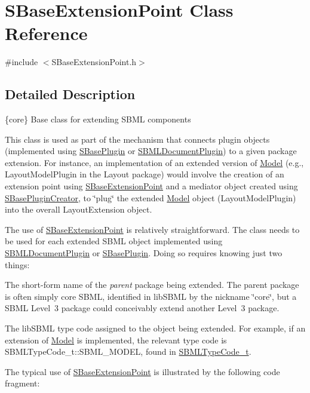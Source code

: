 \hypertarget{class_s_base_extension_point}{}\section{S\+Base\+Extension\+Point Class Reference}
\label{class_s_base_extension_point}


{\ttfamily \#include $<$S\+Base\+Extension\+Point.\+h$>$}



\subsection{Detailed Description}
\{core\} Base class for extending S\+B\+ML components



\begin{DoxyParagraph}{}
This class is used as part of the mechanism that connects plugin objects (implemented using \hyperlink{class_s_base_plugin}{S\+Base\+Plugin} or \hyperlink{class_s_b_m_l_document_plugin}{S\+B\+M\+L\+Document\+Plugin}) to a given package extension. For instance, an implementation of an extended version of \hyperlink{class_model}{Model} (e.\+g., Layout\+Model\+Plugin in the Layout package) would involve the creation of an extension point using \hyperlink{class_s_base_extension_point}{S\+Base\+Extension\+Point} and a mediator object created using \hyperlink{class_s_base_plugin_creator}{S\+Base\+Plugin\+Creator}, to \char`\"{}plug\char`\"{} the extended \hyperlink{class_model}{Model} object (Layout\+Model\+Plugin) into the overall Layout\+Extension object.
\end{DoxyParagraph}
The use of \hyperlink{class_s_base_extension_point}{S\+Base\+Extension\+Point} is relatively straightforward. The class needs to be used for each extended S\+B\+ML object implemented using \hyperlink{class_s_b_m_l_document_plugin}{S\+B\+M\+L\+Document\+Plugin} or \hyperlink{class_s_base_plugin}{S\+Base\+Plugin}. Doing so requires knowing just two things\+:

\begin{DoxyItemize}
\item The short-\/form name of the {\itshape parent} package being extended. The parent package is often simply core S\+B\+ML, identified in lib\+S\+B\+ML by the nickname {\ttfamily \char`\"{}core\char`\"{}}, but a S\+B\+ML Level~3 package could conceivably extend another Level~3 package.\end{DoxyItemize}
\begin{DoxyItemize}
\item The lib\+S\+B\+ML type code assigned to the object being extended. For example, if an extension of \hyperlink{class_model}{Model} is implemented, the relevant type code is S\+B\+M\+L\+Type\+Code\+\_\+t\+::\+S\+B\+M\+L\+\_\+\+M\+O\+D\+EL, found in \hyperlink{_s_b_m_l_type_codes_8h_aa283dddfd7671179362b2f38e2938cfe}{S\+B\+M\+L\+Type\+Code\+\_\+t}.\end{DoxyItemize}
The typical use of \hyperlink{class_s_base_extension_point}{S\+Base\+Extension\+Point} is illustrated by the following code fragment\+:


